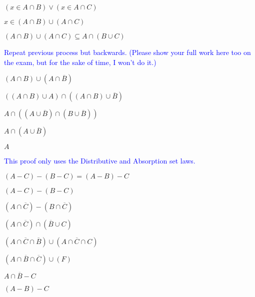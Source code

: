 \documentclass{exam}
\begin{document}
\begin{questions}
\begin{subparts}
\begin{center}
\( (x \in A \cap B) \lor (x \in A \cap C)\)

\( x \in (A \cap B) \cup (A \cap C)\)

\vspace{5mm}

\( (A \cap B) \cup (A \cap C) \subseteq  A \cap (B \cup C) \)

\textcolor{blue}{Repeat previous process but backwards. (Please show your full work here too on the exam, but for the sake of time, I won't do it.)}

\end{center}


\begin{center}

\( (A \cap B) \cup (A \cap \overline{B}) \)

\( ((A \cap B) \cup A) \cap ((A \cap B) \cup \overline{B}) \)

\( A \cap ((A \cup \overline{B}) \cap (B \cup \overline{B})) \)

\( A \cap (A \cup \overline{B})  \)

\( A \)

\textcolor{blue}{This proof only uses the Distributive and Absorption set laws.}

\end{center}


\begin{center}

\( (A - C) - (B - C) = (A - B) - C \)

\( (A - C) - (B - C) \)

\( (A \cap \overline{C}) - (B \cap \overline{C}) \)

\( (A \cap \overline{C}) \cap (\overline{B} \cup C) \)

\( (A \cap \overline{C} \cap \overline{B}) \cup (A \cap \overline{C} \cap C) \)

\( (A \cap \overline{B} \cap \overline{C}) \cup (F) \)

\( A \cap \overline{B} - C \)

\( (A - B) - C \)

\end{center}

\newpage


\begin{center}


\end{center}
\end{subparts}
\end{questions}
\end{document}
